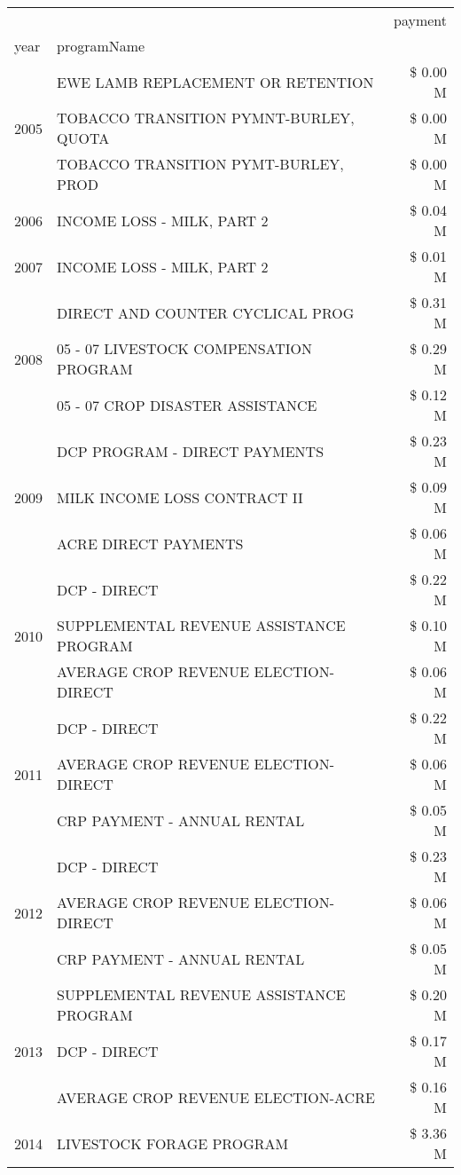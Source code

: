 \begin{tabular}{llr}
\toprule
 &  & payment \\
year & programName &  \\
\midrule
\multirow[t]{3}{*}{2005} & EWE LAMB REPLACEMENT OR RETENTION & \$ 0.00 M \\
 & TOBACCO TRANSITION PYMNT-BURLEY, QUOTA & \$ 0.00 M \\
 & TOBACCO TRANSITION PYMT-BURLEY, PROD & \$ 0.00 M \\
\cline{1-3}
2006 & INCOME LOSS - MILK, PART 2 & \$ 0.04 M \\
\cline{1-3}
2007 & INCOME LOSS - MILK, PART 2 & \$ 0.01 M \\
\cline{1-3}
\multirow[t]{3}{*}{2008} & DIRECT AND COUNTER CYCLICAL PROG & \$ 0.31 M \\
 & 05 - 07 LIVESTOCK COMPENSATION PROGRAM & \$ 0.29 M \\
 & 05 - 07 CROP DISASTER ASSISTANCE & \$ 0.12 M \\
\cline{1-3}
\multirow[t]{3}{*}{2009} & DCP PROGRAM - DIRECT PAYMENTS & \$ 0.23 M \\
 & MILK INCOME LOSS CONTRACT II & \$ 0.09 M \\
 & ACRE DIRECT PAYMENTS & \$ 0.06 M \\
\cline{1-3}
\multirow[t]{3}{*}{2010} & DCP - DIRECT & \$ 0.22 M \\
 & SUPPLEMENTAL REVENUE ASSISTANCE PROGRAM & \$ 0.10 M \\
 & AVERAGE CROP REVENUE ELECTION-DIRECT & \$ 0.06 M \\
\cline{1-3}
\multirow[t]{3}{*}{2011} & DCP - DIRECT & \$ 0.22 M \\
 & AVERAGE CROP REVENUE ELECTION-DIRECT & \$ 0.06 M \\
 & CRP PAYMENT - ANNUAL RENTAL & \$ 0.05 M \\
\cline{1-3}
\multirow[t]{3}{*}{2012} & DCP - DIRECT & \$ 0.23 M \\
 & AVERAGE CROP REVENUE ELECTION-DIRECT & \$ 0.06 M \\
 & CRP PAYMENT - ANNUAL RENTAL & \$ 0.05 M \\
\cline{1-3}
\multirow[t]{3}{*}{2013} & SUPPLEMENTAL REVENUE ASSISTANCE PROGRAM & \$ 0.20 M \\
 & DCP - DIRECT & \$ 0.17 M \\
 & AVERAGE CROP REVENUE ELECTION-ACRE & \$ 0.16 M \\
\cline{1-3}
\multirow[t]{3}{*}{2014} & LIVESTOCK FORAGE PROGRAM & \$ 3.36 M \\

\end{tabular}
